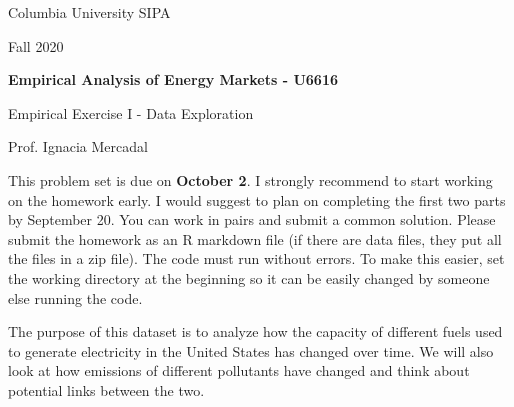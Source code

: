 \documentclass[12pt]{article}
\begin{document}
\begin{flushleft}
Columbia University SIPA	

Fall 2020

\end{flushleft}


\begin{center}
\textbf{Empirical Analysis of Energy Markets - U6616}

Empirical Exercise I - Data Exploration

\end{center}

\begin{flushright}
Prof. Ignacia Mercadal	
\end{flushright}

This problem set is due on \textbf{October 2}. I strongly recommend to start working on the homework early. I would suggest to plan on completing the first two parts by September 20. You can work in pairs and submit a common solution. Please submit the homework as an R markdown file (if there are data files, they put all the files in a zip file). The code must run without errors. To make this easier, set the working directory at the beginning so it can be easily changed by someone else running the code. 

The purpose of this dataset is to analyze how the capacity of different fuels used to generate electricity in the United States has changed over time. We will also look at how emissions of different pollutants have changed and think about potential links between the two.
 
\end{document}
